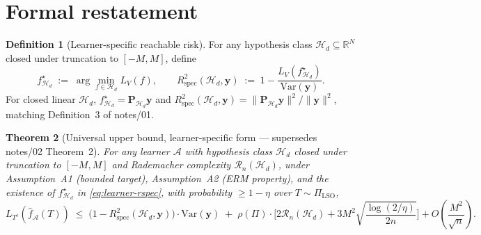 \documentclass[11pt,a4paper]{article}
\theoremstyle{plain}
\newtheorem{theorem}{Theorem}
\theoremstyle{definition}
\newtheorem{definition}[theorem]{Definition}
\theoremstyle{remark}
\newcommand{\by}{\mathbf{y}}
\newcommand{\bP}{\mathbf{P}}
\newcommand{\R}{\mathbb{R}}
\newcommand{\Var}{\mathrm{Var}}
\newcommand{\Rspec}{R^2_{\mathrm{spec}}}
\newcommand{\Acal}{\mathcal{A}}
\newcommand{\Hcal}{\mathcal{H}}
\begin{document}
\section{Formal restatement}
\label{sec:formal}

\begin{definition}[Learner-specific reachable risk]
\label{def:reachable-risk}
For any hypothesis class $\Hcal_d \subseteq \R^N$ closed under truncation
to $[-M, M]$, define
\begin{equation}
    f^\star_{\Hcal_d} \;:=\; \arg\min_{f \in \Hcal_d} L_V(f),
    \qquad
    \Rspec(\Hcal_d, \by) \;:=\; 1 - \frac{L_V(f^\star_{\Hcal_d})}{\Var(\by)}.
    \label{eq:learner-rspec}
\end{equation}
For closed linear $\Hcal_d$, $f^\star_{\Hcal_d} = \bP_{\Hcal_d}\by$ and
$\Rspec(\Hcal_d, \by) = \|\bP_{\Hcal_d}\by\|^2/\|\by\|^2$, matching
Definition~3 of notes/01.
\end{definition}

\begin{theorem}[Universal upper bound, learner-specific form — supersedes
notes/02 Theorem~2]
\label{thm:learner-specific-upper}
For any learner $\Acal$ with hypothesis class $\Hcal_d$ closed under
truncation to $[-M, M]$ and Rademacher complexity $\mathcal{R}_n(\Hcal_d)$,
under Assumption~A1 (bounded target), Assumption~A2 (ERM property),
and the existence of $f^\star_{\Hcal_d}$ in \eqref{eq:learner-rspec},
with probability $\geq 1 - \eta$ over $T \sim \Pi_{\mathrm{LSO}}$,
\begin{equation}
    L_{T^c}(\hat f_\Acal(T))
    \;\leq\; \big(1 - \Rspec(\Hcal_d, \by)\big) \cdot \Var(\by)
        \;+\; \rho(\Pi) \cdot \Bigg[
            2 \mathcal{R}_n(\Hcal_d)
            + 3 M^2 \sqrt{\frac{\log(2/\eta)}{2 n}}
          \Bigg]
        + O\!\left(\frac{M^2}{\sqrt{n}}\right).
    \label{eq:learner-upper}
\end{equation}
\end{theorem}
\end{document}
